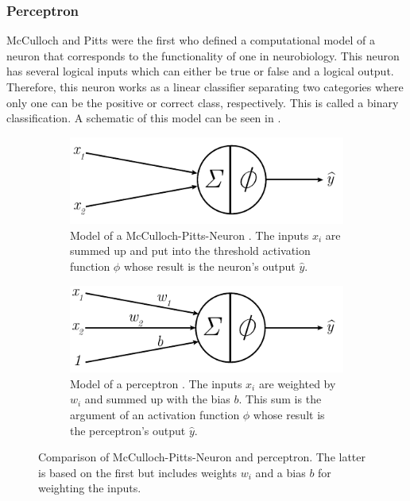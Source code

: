 \subsubsection{Perceptron}
\label{sec:mlp-theorie}
McCulloch and Pitts \cite{McCulloch1988} were the first who defined a computational model of a neuron that corresponds to the functionality of one in neurobiology.
This neuron has several logical inputs which can either be true or false and a logical output.
Therefore, this neuron works as a linear classifier separating two categories where only one can be the positive or correct class, respectively.
This is called a binary classification.
A schematic of this model can be seen in .
\begin{figure}
	\centering
	\begin{subfigure}[t]{.48\textwidth}
		\centering
		\includegraphics[width=\textwidth]{images/neuron.pdf}
		\caption[Model of a McCulloch-Pitts-Neuron]{Model of a McCulloch-Pitts-Neuron \cite{McCulloch1988}. The inputs $x_i$ are summed up and put into the threshold activation function $\phi$ whose result is the neuron's output $\hat{y}$.}
		\label{fig:neuron}
	\end{subfigure}
	\begin{subfigure}[t]{.48\textwidth}
		\centering
		\includegraphics[width=\textwidth]{images/perceptron}
		\caption[Model of a perceptron]{Model of a perceptron \cite{Rosenblatt58}. The inputs $x_i$ are weighted by $w_i$ and summed up with the bias $b$. This sum is the argument of an activation function $\phi$ whose result is the perceptron's output $\hat{y}$.}
		\label{fig:perceptron}
	\end{subfigure}
	\caption{Comparison of McCulloch-Pitts-Neuron and perceptron. The latter is based on the first but includes weights $w_i$ and a bias $b$ for weighting the inputs.}
\end{figure}
